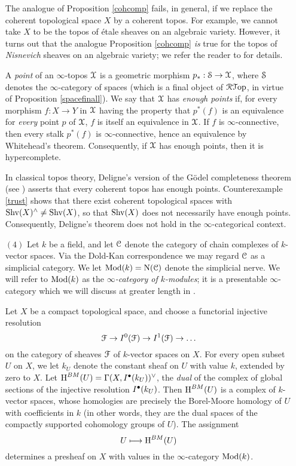 \begin{itemize}
\begin{remark}
The analogue of Proposition \ref{cohcomp} fails, in general, if we replace the coherent topological space $X$ by a coherent topos. For example, we cannot take $X$ to be the topos of \'{e}tale sheaves on an algebraic variety. However, it turns out that the analogue Proposition \ref{cohcomp} {\em is} true for the topos of {\em Nisnevich} sheaves on an algebraic variety; we refer the reader to \cite{DAG} for details.
\end{remark}

\begin{remark}\label{notenough}
A {\it point} of an $\infty$-topos $\operatorname{\mathcal{X}}$ is a geometric morphism $p_{\ast}: \operatorname{\mathcal{S}} \rightarrow \operatorname{\mathcal{X}}$, where $\operatorname{\mathcal{S}}$ denotes the $\infty$-category of spaces (which is a final object of $\operatorname{\mathcal{R}{\mathcal T}op}$, in virtue of Proposition \ref{spacefinall}). We say that $\operatorname{\mathcal{X}}$ has {\it enough points} if, for every morphism $f: X \rightarrow Y$ in $\operatorname{\mathcal{X}}$ having the property that $p^{\ast}(f)$ is an equivalence for {\em every} point $p$ of $\operatorname{\mathcal{X}}$, $f$ is itself an equivalence in $\operatorname{\mathcal{X}}$. If $f$ is $\infty$-connective, then every stalk $p^{\ast}(f)$ is $\infty$-connective, hence an equivalence by Whitehead's theorem. Consequently, if $\operatorname{\mathcal{X}}$ has enough points, then it is hypercomplete.

In classical topos theory, Deligne's version of the G\"{o}del completeness theorem (see \cite{where}) asserts that every coherent topos has enough points.  Counterexample \ref{trust} shows that there exist coherent topological spaces with
$\operatorname{Shv}(X)^{\wedge} \neq \operatorname{Shv}(X)$, so that $\operatorname{Shv}(X)$ does not necessarily have enough points. 
Consequently, Deligne's theorem does not hold in the $\infty$-categorical context.
\end{remark}

\item[$(4)$] Let $k$ be a field, and let $\operatorname{\mathcal{C}}$ denote the category of chain complexes of $k$-vector spaces. Via the Dold-Kan correspondence we may regard $\operatorname{\mathcal{C}}$ as a simplicial category. We let $\operatorname{Mod}(k) = \operatorname{N}(\operatorname{\mathcal{C}})$ denote the simplicial nerve. We will refer to $\operatorname{Mod}(k)$ as the {\it $\infty$-category of $k$-modules}; it is a presentable $\infty$-category which we will discuss at greater length in \cite{DAG}.

Let $X$ be a compact topological space, and choose a functorial injective resolution
$$ \operatorname{\mathcal{F}} \rightarrow I^0( \operatorname{\mathcal{F}}) \rightarrow I^1( \operatorname{\mathcal{F}} ) \rightarrow \ldots $$
on the category of sheaves $\operatorname{\mathcal{F}}$ of $k$-vector spaces on $X$. For every open subset
$U$ on $X$, we let $k_U$ denote the constant sheaf on $U$ with value $k$, extended by zero to $X$. Let $\operatorname{H}^{BM}(U) = \Gamma(X, I^{\bullet}( k_U) )^{\vee}$, the {\it dual} of the complex
of global sections of the injective resolution $I^{\bullet}(k_U)$. Then $\operatorname{H}^{BM}(U)$ is a 
complex of $k$-vector spaces, whose homologies are precisely the Borel-Moore homology of $U$ with coefficients in $k$ (in other words, they are the dual spaces of the compactly supported cohomology groups of $U$). The assignment
$$ U \longmapsto \operatorname{H}^{BM}(U)$$
determines a presheaf on $X$ with values in the $\infty$-category $\operatorname{Mod}(k)$.


\end{itemize}
